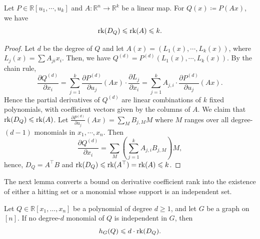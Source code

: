 \documentclass{article}
\begin{document}
\begin{boxlemma} \label{lem:sketch-derivative-rank}
    Let $P \in \mathbb{R}[u_1,\cdots,u_k]$ and $A:\mathbb{R}^n\to \mathbb{R}^k$ be a linear map. For $Q(x) \coloneqq P(Ax)$, we have
    \[
        \operatorname{rk}(D_Q)\leqslant \operatorname{rk}(A)\leqslant k.
    \]
\end{boxlemma}

\begin{proof}
    Let $d$ be the degree of $Q$ and let $A(x) = (L_1(x),\cdots,L_k(x))$, where $L_j(x) = \sum A_{ji}x_i$. Then, we have $Q^{(d)} = P^{(d)}(L_1(x),\cdots,L_k(x))$. By the chain rule,
    \[
        \frac{\partial Q^{(d)}}{\partial x_i} = \sum_{j=1}^k  \frac{\partial P^{(d)}}{\partial u_j} (Ax)\cdot  \frac{\partial L_j}{\partial x_i}=\sum_{j=1}^k A_{j,i} \cdot \frac{\partial P^{(d)}}{\partial u_j}(Ax).
    \]
    Hence the partial derivatives of $Q^{(d)}$ are linear combinations of $k$ fixed polynomials, with coefficient vectors given by the columns of $A$.
We claim that $\operatorname{rk}(D_Q) \leqslant \operatorname{rk}(A)$. 
Let $\frac{\partial P^{(d)}}{\partial u_j} (Ax) = \sum_M B_{j,M}M$ where $M$ ranges over all degree-$(d-1)$ monomials in $x_1,\cdots,x_n$. Then 
\[ \frac{\partial Q^{(d)}}{\partial x_i} =\sum_M \left(\sum_{j=1}^k A_{j,i}B_{j,M}\right)M,\]
hence, $D_Q = A^\top B$ and $\operatorname{rk}(D_Q)\leqslant \operatorname{rk}(A^\top) = \operatorname{rk}(A)\leqslant k$.
\end{proof}


The next lemma converts a bound on derivative coefficient rank into the existence of either a hitting set or a monomial whose support is an independent set. 

\begin{boxlemma}\label{lem:rank-lower-bound}
    Let \(Q \in \mathbb{R}[x_1,\dots,x_n]\) be a polynomial of degree $d\geq 1$, and let $G$ be a graph on $[n]$.
    If no degree-$d$ monomial of $Q$ is independent in $G$, then
    \[
        h_G(Q)\leqslant d \cdot \operatorname{rk}(D_Q).
    \]
\end{boxlemma}

 
\end{document}
